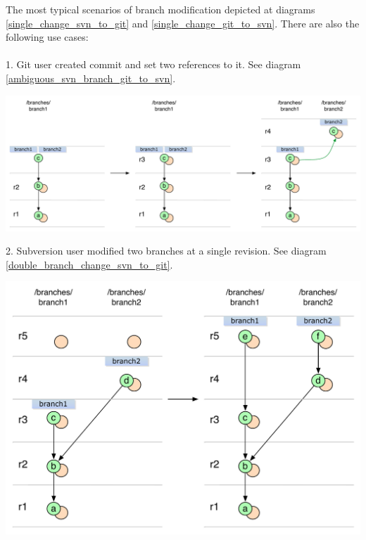 The most typical scenarios of branch modification depicted at diagrams \ref{single_change_svn_to_git} and \ref{single_change_git_to_svn}. There are also the following use cases:
\\\\
1. Git user created commit and set two references to it. See diagram \ref{ambiguous_svn_branch_git_to_svn}.
\begin{center}
\includegraphics[width=\textwidth]{img/diagrams/ambiguous_svn_branch_git_to_svn.pdf}%
\label{ambiguous_svn_branch_git_to_svn}%
\end{center}

2. Subversion user modified two branches at a single revision. See diagram \ref{double_branch_change_svn_to_git}.
\begin{center}
\includegraphics[width=\textwidth]{img/diagrams/double_branch_change_svn_to_git.pdf}%
\label{double_branch_change_svn_to_git}%
\end{center}

